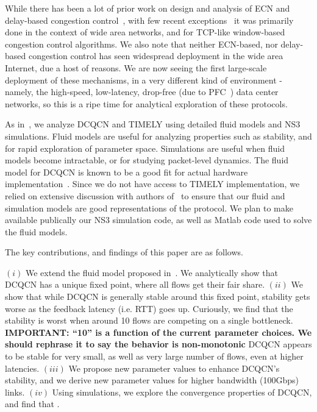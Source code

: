 
While there has been a lot of prior work on design and analysis of ECN and
delay-based congestion control~\cite{ecn, tcp-vegas, Hollot:PIController}, with few
recent exceptions~\cite{dctcp-analysis, qcn-analysis} it was primarily done in
the context of wide area networks, and for TCP-like window-based congestion
control algorithms.  We also note that neither ECN-based, nor delay-based
congestion control has seen widespread deployment in the wide area Internet, due
a host of reasons. We are now seeing the first large-scale deployment of these
mechanisms, in a very different kind of environment - namely, the high-speed,
low-latency, drop-free (due to PFC~\cite{pfc}) data center networks, so this is
a ripe time for analytical exploration of these protocols.


As in~\cite{dctcp-analysis, qcn-analysis}, we analyze DCQCN and TIMELY using
detailed fluid models and NS3 simulations. Fluid models are useful for analyzing
properties such as stability, and for rapid exploration of parameter space.
Simulations are useful when fluid models become intractable, or for studying
packet-level dynamics. The fluid model for DCQCN is known to be a good fit for
actual hardware implementation~\cite{dcqcn}. Since we do not have access to
TIMELY implementation, we relied on extensive discussion with authors
of~\cite{timely} to ensure that our fluid and simulation models are good
representations of the protocol. We plan to make available publically our NS3
simulation code, as well as Matlab code used to solve the fluid models.


The key contributions, and findings of this paper are as follows.

 $(i)$ We extend the fluid model proposed in~\cite{dcqcn}. We
analytically show that DCQCN has a unique fixed point, where all flows get their
fair share. $(ii)$ We show that while DCQCN is generally stable around this
fixed point, stability gets worse as the feedback latency (i.e. RTT) goes up.
Curiously, we find that the stability is worst when around 10 flows are
competing on a single bottleneck. \textbf{IMPORTANT: ``10'' is a
  function of the current parameter choices. We should rephrase it to
  say the behavior is non-monotonic} DCQCN appears to be stable for very small, as
well as very large number of flows, even at higher latencies. $(iii)$ We propose
new parameter values to enhance DCQCN's stability, and we derive new parameter values
for higher bandwidth (100Gbps) links. $(iv)$ Using simulations, we explore the
convergence properties of DCQCN, and find that .

